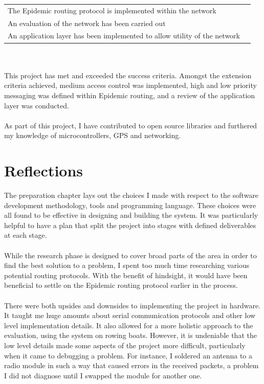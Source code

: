 \documentclass[12pt,a4paper]{report}
\begin{document}
{\begin{tabular}{ll}
The Epidemic routing protocol is implemented within the network\\
An evaluation of the network has been carried out\\
An application layer has been implemented to allow utility of the network \\
\end{tabular} \\ \\
This project has met and exceeded the success criteria. Amongst the extension criteria achieved, medium access control was implemented, high and low priority messaging was defined within Epidemic routing, and a review of the application layer was conducted. \\ \\
As part of this project, I have contributed to open source libraries and furthered my knowledge of microcontrollers, GPS and networking. 

\section{Reflections}
The preparation chapter lays out the choices I made with respect to the software development methodology, tools and programming language. These choices were all found to be effective in designing and building the system. It was particularly helpful to have a plan that split the project into stages with defined deliverables at each stage. \\ \\ 
While the research phase is designed to cover broad parts of the area in order to find the best solution to a problem, I spent too much time researching various potential routing protocols. With the benefit of hindsight, it would have been beneficial to settle on the Epidemic routing protocol earlier in the process. \\ \\
There were both upsides and downsides to implementing the project in hardware. It taught me huge amounts 
about serial communication protocols and other low level implementation details. It also allowed for a more holistic approach to the evaluation, using the system on rowing boats. However, it is undeniable that the low level details made some aspects of the project more difficult, particularly when it came to debugging a problem. For instance, I soldered an antenna to a radio module in such a way that caused errors in the received packets, a problem I did not diagnose until I swapped the module for another one. 

}
\end{document}
